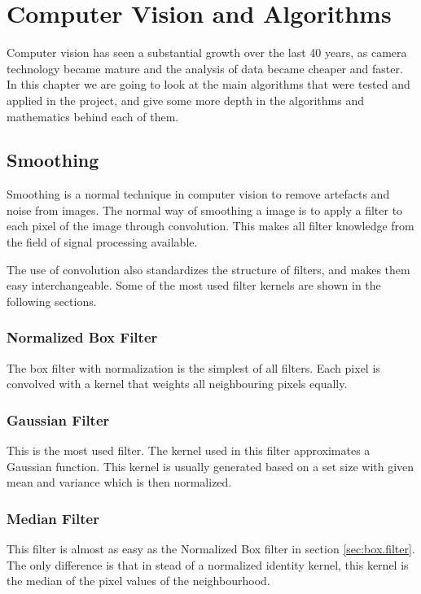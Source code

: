
\chapter{Computer Vision and Algorithms}

Computer vision has seen a substantial growth over the last 40 years, as camera technology became mature 
and the analysis of data became cheaper and faster. In this chapter we are going to look at the main algorithms 
that were tested and applied in the project, and give some more depth in the algorithms and mathematics behind each of them.

\section{Smoothing}\label{sec:smooth}
Smoothing is a normal technique in computer vision to remove artefacts and noise from images. The normal way 
of smoothing a image is to apply a filter to each pixel of the image through convolution. This makes 
all filter knowledge from the field of signal processing available.

The use of convolution also standardizes the structure of filters, and makes them easy interchangeable. Some 
of the most used filter kernels are shown in the following sections.

\subsection{Normalized Box Filter}\label{sec:box.filter}
The box filter with normalization is the simplest of all filters. Each pixel is convolved with a kernel 
that weights all neighbouring pixels equally.

\subsection{Gaussian Filter}\label{sec:gaussian.filter}
This is the most used filter. The kernel used in this filter approximates a Gaussian function. This kernel 
is usually generated based on a set size with given mean and variance which is then normalized.

\subsection{Median Filter}\label{sec:median.filter}
This filter is almost as easy as the Normalized Box filter in section \vref{sec:box.filter}. The only difference is that 
in stead of a normalized identity kernel, this kernel is the median of the pixel values of the neighbourhood.

